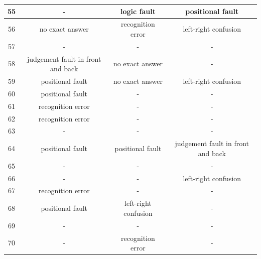 \documentclass[twocolumn,11pt]{report}
\begin{document}
\begin{table}[ht]
{\begin{tabular}{|c|c|c|c|}
    55              & -                                 & logic fault           & positional fault                 \\ \hline
    56              & no exact answer                   & recognition error    & left-right confusion              \\ \hline
    57              & -                                 & -                    & -                                 \\ \hline
    58              & judgement fault in front and back & no exact answer      & -                                 \\ \hline
    59              & positional fault                  & no exact answer      & left-right confusion              \\ \hline
    60              & positional fault                  & -                    & -                                 \\ \hline
    61              & recognition error                 & -                    & -                                 \\ \hline
    62              & recognition error                 & -                    & -                                 \\ \hline
    63              & -                                 & -                    & -                                 \\ \hline
    64              & positional fault                  & positional fault    & judgement fault in front and back \\ \hline
    65              & -                                 & -                    & -                                 \\ \hline
    66              & -                                 & -                    & left-right confusion              \\ \hline
    67              & recognition error                 & -                    & -                                 \\ \hline
    68              & positional fault                  & left-right confusion & -                                 \\ \hline
    69              & -                                 & -                    & -                                 \\ \hline
    70              & -                                 & recognition error    & -                                 \\ \hline

\end{tabular}}
\end{table}
\end{document}
